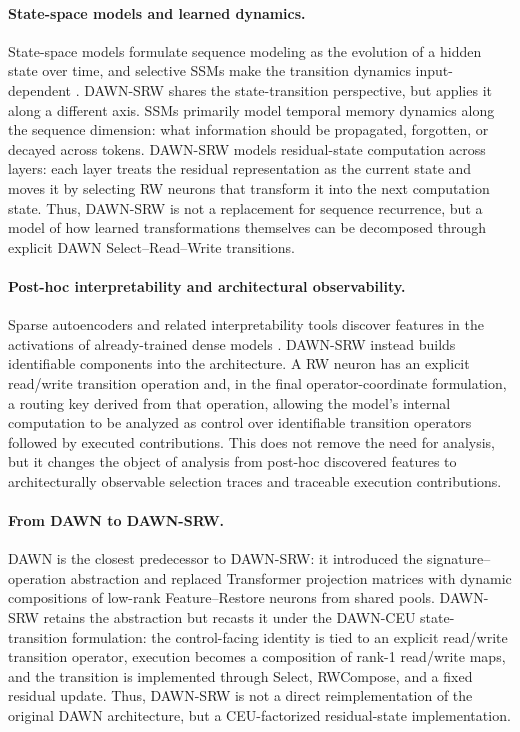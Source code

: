 \documentclass{article}
\begin{document}
\paragraph{State-space models and learned dynamics.}
State-space models formulate sequence modeling as the evolution of a hidden state over time, and selective SSMs make the transition dynamics input-dependent \cite{gu2022efficiently, gu2024mamba}. DAWN-SRW shares the state-transition perspective, but applies it along a different axis. SSMs primarily model temporal memory dynamics along the sequence dimension: what information should be propagated, forgotten, or decayed across tokens. DAWN-SRW models residual-state computation across layers: each layer treats the residual representation as the current state and moves it by selecting RW neurons that transform it into the next computation state. Thus, DAWN-SRW is not a replacement for sequence recurrence, but a model of how learned transformations themselves can be decomposed through explicit DAWN Select--Read--Write transitions.


\paragraph{Post-hoc interpretability and architectural observability.}
Sparse autoencoders and related interpretability tools discover features in the activations of already-trained dense models \cite{cunningham2023sparse}. DAWN-SRW instead builds identifiable components into the architecture. A RW neuron has an explicit read/write transition operation and, in the final operator-coordinate formulation, a routing key derived from that operation, allowing the model's internal computation to be analyzed as control over identifiable transition operators followed by executed contributions. This does not remove the need for analysis, but it changes the object of analysis from post-hoc discovered features to architecturally observable selection traces and traceable execution contributions.

\paragraph{From DAWN to DAWN-SRW.}
DAWN \cite{choi2026dawn} is the closest predecessor to DAWN-SRW: it introduced the signature--operation abstraction and replaced Transformer projection matrices with dynamic compositions of low-rank Feature--Restore neurons from shared pools. DAWN-SRW retains the abstraction but recasts it under the DAWN-CEU state-transition formulation: the control-facing identity is tied to an explicit read/write transition operator, execution becomes a composition of rank-1 read/write maps, and the transition is implemented through Select, RWCompose, and a fixed residual update. Thus, DAWN-SRW is not a direct reimplementation of the original DAWN architecture, but a CEU-factorized residual-state implementation.
\end{document}
